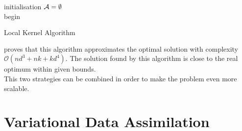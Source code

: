 \begin{algorithm}[h]
 initialisation\;
 $\mathcal{A} = \emptyset$ \\
 begin\;
\caption{Local Kernel Algorithm}
\label{alg:local}
\end{algorithm} 


\citet{krause_near-optimal_2008} proves that this algorithm approximates the optimal solution with complexity $\mathcal{O}(nd^3 + nk + kd^4)$. The solution found by this algorithm is close to the real optimum within given bounds. \\

This two strategies can be combined in order to make the problem even more scalable. 

\section{Variational Data Assimilation}





